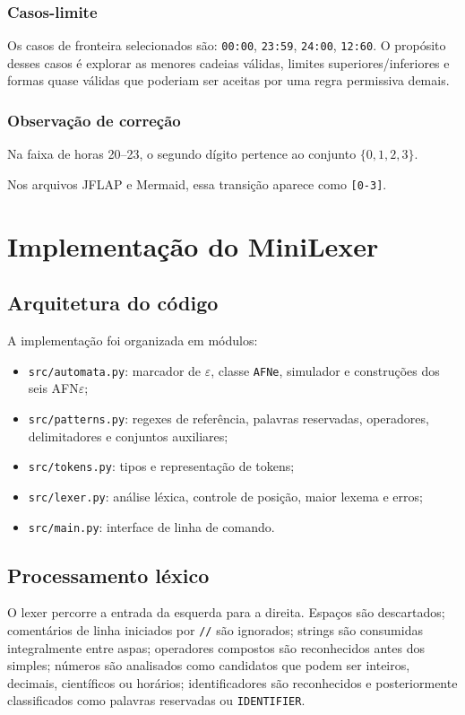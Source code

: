 \documentclass[12pt,a4paper,oneside]{report}
\begin{document}
\subsection{Casos-limite}
Os casos de fronteira selecionados são: \texttt{00:00}, \texttt{23:59}, \texttt{24:00}, \texttt{12:60}.
\medskip
O propósito desses casos é explorar as menores cadeias válidas, limites superiores/inferiores e formas quase válidas que poderiam ser aceitas por uma regra permissiva demais.
\subsection{Observação de correção}
Na faixa de horas 20--23, o segundo dígito pertence ao conjunto \(\{0,1,2,3\}\).

Nos arquivos JFLAP e Mermaid, essa transição aparece como \texttt{[0-3]}. 



\chapter{Implementação do MiniLexer}

\section{Arquitetura do código}

A implementação foi organizada em módulos:

\begin{itemize}
    \item \texttt{src/automata.py}: marcador de $\varepsilon$, classe \texttt{AFNe}, simulador e construções dos seis AFN$\varepsilon$;
    \item \texttt{src/patterns.py}: regexes de referência, palavras reservadas, operadores, delimitadores e conjuntos auxiliares;
    \item \texttt{src/tokens.py}: tipos e representação de tokens;
    \item \texttt{src/lexer.py}: análise léxica, controle de posição, maior lexema e erros;
    \item \texttt{src/main.py}: interface de linha de comando.
\end{itemize}

\section{Processamento léxico}

O lexer percorre a entrada da esquerda para a direita. Espaços são descartados; comentários de linha iniciados por \texttt{//} são ignorados; strings são consumidas integralmente entre aspas; operadores compostos são reconhecidos antes dos simples; números são analisados como candidatos que podem ser inteiros, decimais, científicos ou horários; identificadores são reconhecidos e posteriormente classificados como palavras reservadas ou \texttt{IDENTIFIER}.
\end{document}
